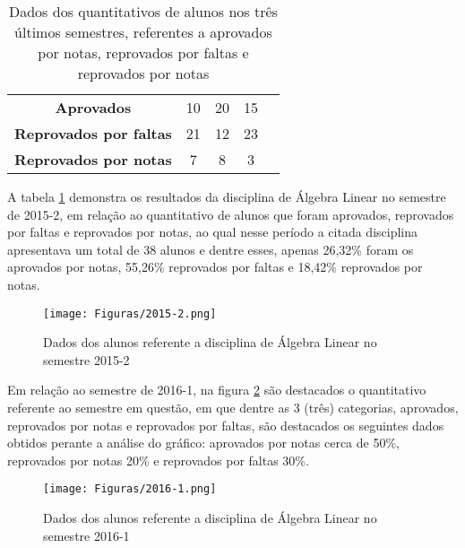 \begin{table}[!htp]
\begin{tabular}{lcccl}
\multicolumn{1}{|c|}{\cellcolor[HTML]{EFEFEF}\textbf{Aprovados}}            & \multicolumn{1}{c|}{\cellcolor[HTML]{EFEFEF}10}              & \multicolumn{1}{c|}{\cellcolor[HTML]{EFEFEF}20}              & \multicolumn{1}{c|}{\cellcolor[HTML]{EFEFEF}15}              &  \\ \cline{1-4}
\multicolumn{1}{|c|}{\textbf{Reprovados por faltas}}                        & \multicolumn{1}{c|}{21}                                      & \multicolumn{1}{c|}{12}                                      & \multicolumn{1}{c|}{23}                                      &  \\ \cline{1-4}
\multicolumn{1}{|c|}{\cellcolor[HTML]{EFEFEF}\textbf{Reprovados por notas}} & \multicolumn{1}{c|}{\cellcolor[HTML]{EFEFEF}7}               & \multicolumn{1}{c|}{\cellcolor[HTML]{EFEFEF}8}               & \multicolumn{1}{c|}{\cellcolor[HTML]{EFEFEF}3}               &  \\ \cline{1-4}
\end{tabular}
    \caption{Dados dos quantitativos de alunos nos três últimos semestres, referentes a aprovados por notas, reprovados por faltas e reprovados por notas}
    \label{dados_tres_semestres_alunos_algebra}
\end{table}

A tabela \ref{algebra_linear_2015_2} demonstra os resultados da disciplina de Álgebra Linear no semestre de 2015-2, em relação ao quantitativo de alunos que foram aprovados, reprovados por faltas e reprovados por notas, ao qual nesse período a citada disciplina apresentava um total de 38 alunos e dentre esses, apenas 26,32\% foram os aprovados por notas, 55,26\% reprovados por faltas e 18,42\% reprovados por notas.

\begin{figure}[!htb]
  \centering 
  \texttt{[image: Figuras/2015-2.png]}
  \caption{Dados dos alunos referente a disciplina de Álgebra Linear no semestre 2015-2}\label{algebra_linear_2015_2}
\end{figure}

Em relação ao semestre de 2016-1, na figura \ref{algebra_linear_2016_1} são destacados o quantitativo referente ao semestre em questão, em que dentre as 3 (três) categorias, aprovados, reprovados por notas e reprovados por faltas, são destacados os seguintes dados obtidos perante a análise do gráfico: aprovados por notas cerca de 50\%, reprovados por notas 20\% e reprovados por faltas 30\%.

\begin{figure}[!htb]
  \centering 
  \texttt{[image: Figuras/2016-1.png]}
  \caption{Dados dos alunos referente a disciplina de Álgebra Linear no semestre 2016-1}\label{algebra_linear_2016_1}
\end{figure}


